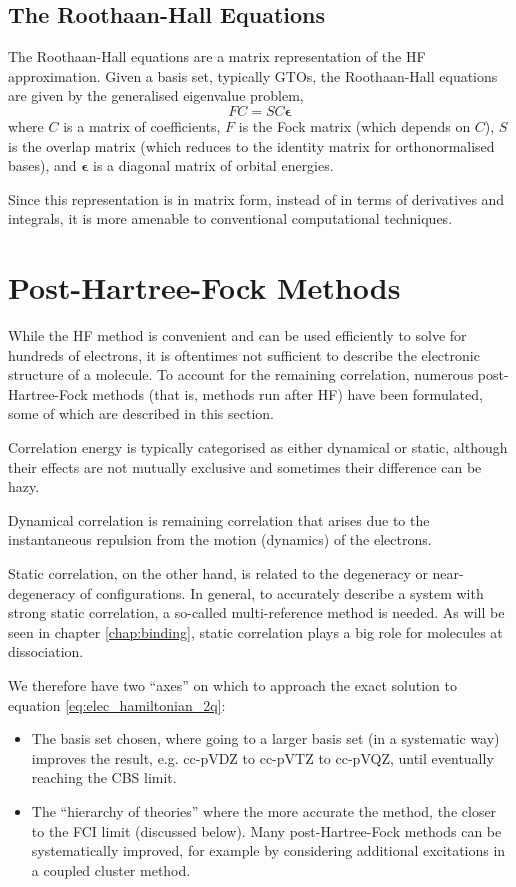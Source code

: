 \subsection{The Roothaan-Hall Equations}

The Roothaan-Hall equations are a matrix representation of the \gls{HF} approximation.\cite{roothaanNew1951,hallMolecular1997} Given a basis set, typically \glspl{GTO}, the Roothaan-Hall equations are given by the generalised eigenvalue problem,
\begin{equation}
    FC = SC\bm\epsilon
\end{equation}
where $C$ is a matrix of coefficients, $F$ is the Fock matrix (which depends on $C$), $S$ is the overlap matrix (which reduces to the identity matrix for orthonormalised bases), and $\bm\epsilon$ is a diagonal matrix of orbital energies.

Since this representation is in matrix form, instead of in terms of derivatives and integrals, it is more amenable to conventional computational techniques.

\section{Post-Hartree-Fock Methods}
\label{sec:post-hf}

While the \gls{HF} method is convenient and can be used efficiently to solve for hundreds of electrons, it is oftentimes not sufficient to describe the electronic structure of a molecule. To account for the remaining correlation, numerous post-Hartree-Fock methods (that is, methods run after \gls{HF}) have been formulated, some of which are described in this section.

Correlation energy is typically categorised as either dynamical or static, although their effects are not mutually exclusive and sometimes their difference can be hazy.

Dynamical correlation is remaining correlation that arises due to the instantaneous repulsion from the motion (dynamics) of the electrons.

Static correlation, on the other hand, is related to the degeneracy or near-degeneracy of configurations. In general, to accurately describe a system with strong static correlation, a so-called multi-reference method is needed. As will be seen in chapter \ref{chap:binding}, static correlation plays a big role for molecules at dissociation.

We therefore have two ``axes'' on which to approach the exact solution to equation \eqref{eq:elec_hamiltonian_2q}:
\begin{itemize}
    \item The basis set chosen, where going to a larger basis set (in a systematic way) improves the result, e.g. cc-pVDZ to cc-pVTZ to cc-pVQZ, until eventually reaching the \gls{CBS} limit.
    \item The ``hierarchy of theories'' where the more accurate the method, the closer to the \gls{FCI} limit (discussed below). Many post-Hartree-Fock methods can be systematically improved, for example by considering additional excitations in a coupled cluster method.
\end{itemize}


